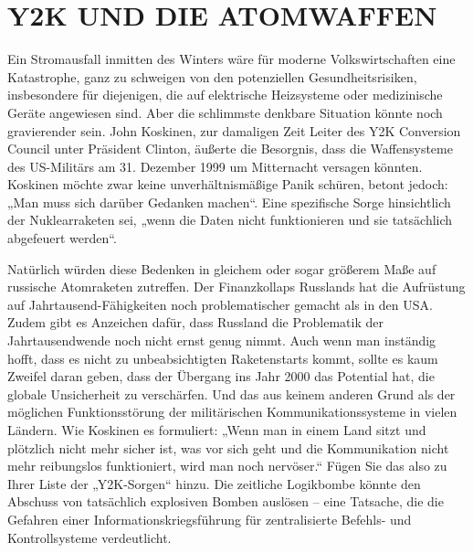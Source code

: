 \documentclass[
  a5paper,
  smalldemyvopaper,10pt,twoside,onecolumn,openright,extrafontsizes,hidelinks]{memoir}
\begin{document}
\section{Y2K UND DIE ATOMWAFFEN}\label{y2k-und-die-atomwaffen}

Ein Stromausfall inmitten des Winters wäre für moderne Volkswirtschaften
eine Katastrophe, ganz zu schweigen von den potenziellen
Gesundheitsrisiken, insbesondere für diejenigen, die auf elektrische
Heizsysteme oder medizinische Geräte angewiesen sind. Aber die
schlimmste denkbare Situation könnte noch gravierender sein. John
Koskinen, zur damaligen Zeit Leiter des Y2K Conversion Council unter
Präsident Clinton, äußerte die Besorgnis, dass die Waffensysteme des
US-Militärs am 31. Dezember 1999 um Mitternacht versagen könnten.
Koskinen möchte zwar keine unverhältnismäßige Panik schüren, betont
jedoch: „Man muss sich darüber Gedanken machen``. Eine spezifische Sorge
hinsichtlich der Nuklearraketen sei, „wenn die Daten nicht funktionieren
und sie tatsächlich abgefeuert werden``.

Natürlich würden diese Bedenken in gleichem oder sogar größerem Maße auf
russische Atomraketen zutreffen. Der Finanzkollaps Russlands hat die
Aufrüstung auf Jahrtausend-Fähigkeiten noch problematischer gemacht als
in den USA. Zudem gibt es Anzeichen dafür, dass Russland die Problematik
der Jahrtausendwende noch nicht ernst genug nimmt. Auch wenn man
inständig hofft, dass es nicht zu unbeabsichtigten Raketenstarts kommt,
sollte es kaum Zweifel daran geben, dass der Übergang ins Jahr 2000 das
Potential hat, die globale Unsicherheit zu verschärfen. Und das aus
keinem anderen Grund als der möglichen Funktionsstörung der
militärischen Kommunikationssysteme in vielen Ländern. Wie Koskinen es
formuliert: „Wenn man in einem Land sitzt und plötzlich nicht mehr
sicher ist, was vor sich geht und die Kommunikation nicht mehr
reibungslos funktioniert, wird man noch nervöser.`` Fügen Sie das also
zu Ihrer Liste der „Y2K-Sorgen`` hinzu. Die zeitliche Logikbombe könnte
den Abschuss von tatsächlich explosiven Bomben auslösen -- eine
Tatsache, die die Gefahren einer Informationskriegsführung für
zentralisierte Befehls- und Kontrollsysteme verdeutlicht.
\end{document}
